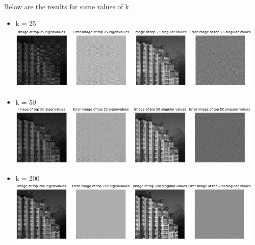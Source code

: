 \documentclass[12pt]{article}
\begin{document}
\begin{enumerate}
		Below are the results for some values of k
		\begin{itemize}
		\item k = 25\\
			\includegraphics[scale= 0.8]{25}
		\item k = 50\\
			\includegraphics[scale= 0.8]{50}
		\item k = 200\\
			\includegraphics[scale= 0.8]{200}
		\end{itemize}


\end{enumerate}
\end{document}

